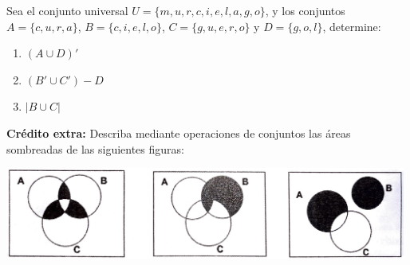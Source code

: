 \documentclass[12pt]{article}
\begin{document}
\begin{problema}
    Sea el conjunto universal $U=\{m,u,r,c,i,e,l,a,g,o\}$, y los conjuntos $A=\{c,u,r,a\}$, $B=\{c,i,e,l,o\}$, $C=\{g,u,e,r,o\}$ y $D=\{g,o,l\}$, determine:

    \renewcommand{\labelenumi}{\alph{enumi})}
    \begin{enumerate}
        \item $(A \cup D)'$
        \item $(B' \cup C') - D$
        \item $|B \cup C|$
    \end{enumerate}
\end{problema}

\textbf{Crédito extra:} Describa mediante operaciones de conjuntos las áreas sombreadas de las siguientes figuras:

    \begin{center}
        \includegraphics[height=3cm]{Imagenes/IMG1/Sombreado3.jpg}
    \end{center}
\end{document}
